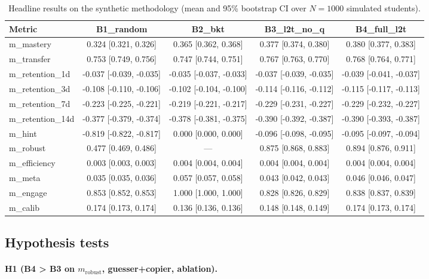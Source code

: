\begin{table}
\centering
\begin{tabular}{lcccc}
\hline
Metric & B1\_random & B2\_bkt & B3\_l2t\_no\_q & B4\_full\_l2t \\
\hline
m\_mastery & 0.324 [0.321, 0.326] & 0.365 [0.362, 0.368] & 0.377 [0.374, 0.380] & 0.380 [0.377, 0.383] \\
m\_transfer & 0.753 [0.749, 0.756] & 0.747 [0.744, 0.751] & 0.767 [0.763, 0.770] & 0.768 [0.764, 0.771] \\
m\_retention\_1d & -0.037 [-0.039, -0.035] & -0.035 [-0.037, -0.033] & -0.037 [-0.039, -0.035] & -0.039 [-0.041, -0.037] \\
m\_retention\_3d & -0.108 [-0.110, -0.106] & -0.102 [-0.104, -0.100] & -0.114 [-0.116, -0.112] & -0.115 [-0.117, -0.113] \\
m\_retention\_7d & -0.223 [-0.225, -0.221] & -0.219 [-0.221, -0.217] & -0.229 [-0.231, -0.227] & -0.229 [-0.232, -0.227] \\
m\_retention\_14d & -0.377 [-0.379, -0.374] & -0.378 [-0.381, -0.375] & -0.390 [-0.392, -0.387] & -0.390 [-0.393, -0.387] \\
m\_hint & -0.819 [-0.822, -0.817] & 0.000 [0.000, 0.000] & -0.096 [-0.098, -0.095] & -0.095 [-0.097, -0.094] \\
m\_robust & 0.477 [0.469, 0.486] & — & 0.875 [0.868, 0.883] & 0.894 [0.876, 0.911] \\
m\_efficiency & 0.003 [0.003, 0.003] & 0.004 [0.004, 0.004] & 0.004 [0.004, 0.004] & 0.004 [0.004, 0.004] \\
m\_meta & 0.035 [0.035, 0.036] & 0.057 [0.057, 0.058] & 0.043 [0.042, 0.043] & 0.046 [0.046, 0.047] \\
m\_engage & 0.853 [0.852, 0.853] & 1.000 [1.000, 1.000] & 0.828 [0.826, 0.829] & 0.838 [0.837, 0.839] \\
m\_calib & 0.174 [0.173, 0.174] & 0.136 [0.136, 0.136] & 0.148 [0.148, 0.149] & 0.174 [0.173, 0.174] \\
\hline
\end{tabular}
\caption{Headline results on the synthetic methodology (mean and 95\% bootstrap CI over $N=1000$ simulated students).}
\label{tab:headline-synthetic}
\end{table}

\subsection{Hypothesis tests}

\paragraph{H1 (B4 > B3 on $m_{\mathrm{robust}}$, guesser+copier, ablation).}

